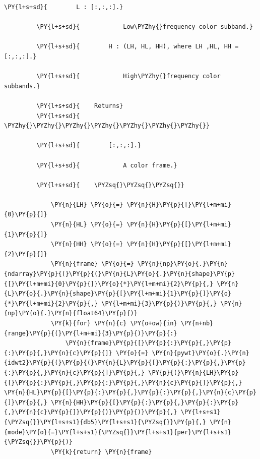 \begin{Verbatim}[commandchars=\\\{\}]
         \PY{l+s+sd}{        L : [:,:,:].}
         
         \PY{l+s+sd}{            Low\PYZhy{}frequency color subband.}
         
         \PY{l+s+sd}{        H : (LH, HL, HH), where LH ,HL, HH = [:,:,:].}
         
         \PY{l+s+sd}{            High\PYZhy{}frequency color subbands.}
         
         \PY{l+s+sd}{    Returns}
         \PY{l+s+sd}{    \PYZhy{}\PYZhy{}\PYZhy{}\PYZhy{}\PYZhy{}\PYZhy{}\PYZhy{}}
         
         \PY{l+s+sd}{        [:,:,:].}
         
         \PY{l+s+sd}{            A color frame.}
         
         \PY{l+s+sd}{    \PYZsq{}\PYZsq{}\PYZsq{}}
         
             \PY{n}{LH} \PY{o}{=} \PY{n}{H}\PY{p}{[}\PY{l+m+mi}{0}\PY{p}{]}
             \PY{n}{HL} \PY{o}{=} \PY{n}{H}\PY{p}{[}\PY{l+m+mi}{1}\PY{p}{]}
             \PY{n}{HH} \PY{o}{=} \PY{n}{H}\PY{p}{[}\PY{l+m+mi}{2}\PY{p}{]}
             \PY{n}{frame} \PY{o}{=} \PY{n}{np}\PY{o}{.}\PY{n}{ndarray}\PY{p}{(}\PY{p}{(}\PY{n}{L}\PY{o}{.}\PY{n}{shape}\PY{p}{[}\PY{l+m+mi}{0}\PY{p}{]}\PY{o}{*}\PY{l+m+mi}{2}\PY{p}{,} \PY{n}{L}\PY{o}{.}\PY{n}{shape}\PY{p}{[}\PY{l+m+mi}{1}\PY{p}{]}\PY{o}{*}\PY{l+m+mi}{2}\PY{p}{,} \PY{l+m+mi}{3}\PY{p}{)}\PY{p}{,} \PY{n}{np}\PY{o}{.}\PY{n}{float64}\PY{p}{)}
             \PY{k}{for} \PY{n}{c} \PY{o+ow}{in} \PY{n+nb}{range}\PY{p}{(}\PY{l+m+mi}{3}\PY{p}{)}\PY{p}{:}
                 \PY{n}{frame}\PY{p}{[}\PY{p}{:}\PY{p}{,}\PY{p}{:}\PY{p}{,}\PY{n}{c}\PY{p}{]} \PY{o}{=} \PY{n}{pywt}\PY{o}{.}\PY{n}{idwt2}\PY{p}{(}\PY{p}{(}\PY{n}{L}\PY{p}{[}\PY{p}{:}\PY{p}{,}\PY{p}{:}\PY{p}{,}\PY{n}{c}\PY{p}{]}\PY{p}{,} \PY{p}{(}\PY{n}{LH}\PY{p}{[}\PY{p}{:}\PY{p}{,}\PY{p}{:}\PY{p}{,}\PY{n}{c}\PY{p}{]}\PY{p}{,} \PY{n}{HL}\PY{p}{[}\PY{p}{:}\PY{p}{,}\PY{p}{:}\PY{p}{,}\PY{n}{c}\PY{p}{]}\PY{p}{,} \PY{n}{HH}\PY{p}{[}\PY{p}{:}\PY{p}{,}\PY{p}{:}\PY{p}{,}\PY{n}{c}\PY{p}{]}\PY{p}{)}\PY{p}{)}\PY{p}{,} \PY{l+s+s1}{\PYZsq{}}\PY{l+s+s1}{db5}\PY{l+s+s1}{\PYZsq{}}\PY{p}{,} \PY{n}{mode}\PY{o}{=}\PY{l+s+s1}{\PYZsq{}}\PY{l+s+s1}{per}\PY{l+s+s1}{\PYZsq{}}\PY{p}{)}
             \PY{k}{return} \PY{n}{frame}
\end{Verbatim}


